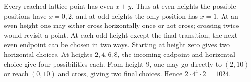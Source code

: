 Every reached lattice point has even $x+y$. Thus at even heights the possible positions have $x=0,2$, and at odd heights the only position has $x=1$. At an even height one may either cross horizontally once or not cross; crossing twice would revisit a point. At each odd height except the final transition, the next even endpoint can be chosen in two ways. Starting at height zero gives two horizontal choices. At heights $2,4,6,8$, the incoming endpoint and horizontal choice give four possibilities each. From height $9$, one may go directly to $(2,10)$ or reach $(0,10)$ and cross, giving two final choices. Hence $2\cdot4^4\cdot2=\boxed{1024}$.
